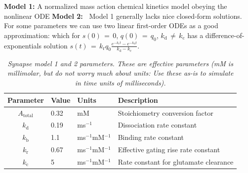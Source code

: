 \documentclass[11pt]{article}
\begin{document}
\textbf{Model 1:} A normalized mass action chemical kinetics model obeying the nonlinear ODE 
\textbf{Model 2:~} Model 1 generally lacks nice closed-form solutions. For some parameters we can use two linear first-order ODEs as a good approximation:
which for $s(0)\,{=}\,0$, $q(0)\,{=}\,q_0$, $k_\mathrm{d}\,{\ne}\,k_\mathrm{c}$ has a difference-of-exponentials solution $
s(t)\,{=}\, 
k_\mathrm{r} q_0
\tfrac{e^{-k_\mathrm{c} t}-e^{-k_\mathrm{d} t}}
{k_\mathrm{d} - k_\mathrm{c}}
$.
\vspace{-\baselineskip}
\begin{table}[h!]
  \centering \small 
  \begin{tabular}{clll}
    \textbf{Parameter} & \textbf{Value} & \textbf{Units} & \textbf{Description} \\
    \midrule
    $A_\mathrm{total}$ & 0.32 & mM & Stoichiometry conversion factor \\
    $k_\mathrm{d}$ & 0.19 & ms$^{-1}$ & Dissociation rate constant \\
    $k_\mathrm{b}$ & 1.1 & ms$^{-1}$mM$^{-1}$ & Binding rate constant \\
    $k_\mathrm{r}$ & 0.67  & ms$^{-1}$mM$^{-1}$ & Effective gating rise rate constant\\
    $k_\mathrm{c}$ & 5 & ms$^{-1}$mM$^{-1}$ & Rate constant for glutamate clearance \\
  \end{tabular}
  \caption{\textit{Synapse model 1 and 2 parameters. These are effective parameters (mM is millimolar, but do not worry much about units: Use these as-is to simulate in time units of milliseconds).}}
  \label{syn1aparams}
\end{table}
\end{document}
